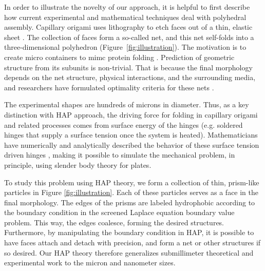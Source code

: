 In order to illustrate the novelty of our approach, it is helpful to first describe how current experimental and mathematical techniques deal with polyhedral assembly. Capillary origami uses lithography to etch faces out of a thin, elastic sheet \cite{Pandey2011,Reynolds2019}. The collection of faces form a so-called net, and this net self-folds into a three-dimensional polyhedron (Figure~\ref{fig:illustration}). The motivation is to create micro containers to mimc protein folding \cite{Reynolds2019}. Prediction of geometric structure from its subunits is non-trivial. That is because the final morphology depends on the net structure, physical interactions, and the surrounding media, and researchers have formulated optimality criteria for these nets \cite{Araujo2018,Pandey2011}. 

The experimental shapes are hundreds of microns in diameter. Thus, as a key distinction with HAP approach, the driving force for folding in capillary origami and related processes comes from surface energy of the hinges (e.g. soldered hinges that supply a surface tension once the system is heated). Mathematicians have numerically and analytically described the behavior of these surface tension driven hinges \cite{Bico2018,Peraud2014,Brubaker2016}, making it possible to simulate the mechanical problem, in principle, using slender body theory for plates. 

To study this problem using HAP theory, we form a collection of thin, prism-like particles in Figure \ref{fig:illustration}. 
Each of these particles serves as a face in the final morphology. The edges of the prisms are labeled hydrophobic according to the boundary condition in the screened Laplace equation boundary value problem. This way, the edges coalesce, forming the desired structures. Furthermore, 
by manipulating the boundary condition in HAP, it is possible to have faces attach and detach with precision, and form a net or other structures if so desired. Our HAP theory therefore generalizes submillimeter theoretical and experimental work to the micron and nanometer sizes. 


